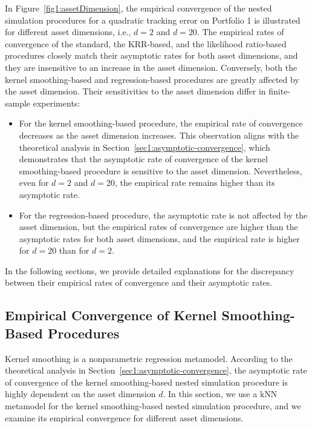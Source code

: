 In Figure~\ref{fig1:assetDimension}, the empirical convergence of the nested simulation procedures for a quadratic tracking error on Portfolio 1 is illustrated for different asset dimensions, i.e., $d = 2$ and $d = 20$.
The empirical rates of convergence of the standard, the KRR-based, and the likelihood ratio-based procedures closely match their asymptotic rates for both asset dimensions, and they are insensitive to an increase in the asset dimension.
Conversely, both the kernel smoothing-based and regression-based procedures are greatly affected by the asset dimension.
Their sensitivities to the asset dimension differ in finite-sample experiments:
\begin{itemize}    
    \item For the kernel smoothing-based procedure, the empirical rate of convergence decreases as the asset dimension increases. 
    This observation aligns with the theoretical analysis in Section~\ref{sec1:asymptotic-convergence}, which demonstrates that the asymptotic rate of convergence of the kernel smoothing-based procedure is sensitive to the asset dimension.
    Nevertheless, even for $d = 2$ and $d = 20$, the empirical rate remains higher than its asymptotic rate.
    \item For the regression-based procedure, the asymptotic rate is not affected by the asset dimension, but the empirical rates of convergence are higher than the asymptotic rates for both asset dimensions, and the empirical rate is higher for $d = 20$ than for $d = 2$.
\end{itemize}
In the following sections, we provide detailed explanations for the discrepancy between their empirical rates of convergence and their asymptotic rates.

\subsection{Empirical Convergence of Kernel Smoothing-Based Procedures} \label{sec1:kernel-smoothing-convergence}

Kernel smoothing is a nonparametric regression metamodel.
According to the theoretical analysis in Section~\ref{sec1:asymptotic-convergence}, the asymptotic rate of convergence of the kernel smoothing-based nested simulation procedure is highly dependent on the asset dimension $d$.
In this section, we use a kNN metamodel for the kernel smoothing-based nested simulation procedure, and we examine its empirical convergence for different asset dimensions.

